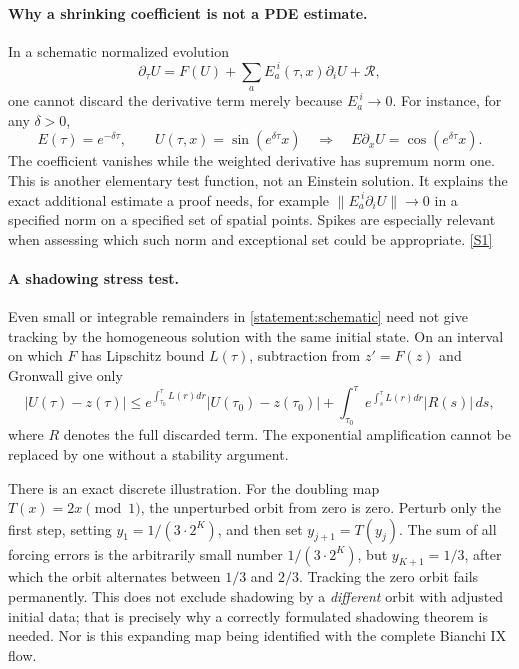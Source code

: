 \documentclass[11pt,a4paper]{article}
\newcommand{\sref}[2]{\hyperlink{source:#1:#2}{[S#2]}}
\numberwithin{equation}{section}
\begin{document}
\paragraph{Why a shrinking coefficient is not a PDE estimate.}
In a schematic normalized evolution
\begin{equation}\label{statement:schematic}
 \partial_\tau U=F(U)+\sum_a E_a^{\ i}(\tau,x)\partial_iU+\mathcal R,
\end{equation}
one cannot discard the derivative term merely because $E_a^{\ i}\to0$.
For instance, for any $\delta>0$,
\[
 E(\tau)=e^{-\delta\tau},\qquad
 U(\tau,x)=\sin(e^{\delta\tau}x)
 \quad\Longrightarrow\quad
 E\partial_xU=\cos(e^{\delta\tau}x).
\]
The coefficient vanishes while the weighted derivative has supremum norm one.
This is another elementary test function, not an Einstein solution. It
explains the exact additional estimate a proof needs, for example
$\|E_a^{\ i}\partial_iU\|\to0$ in a specified norm on a specified set of spatial
points. Spikes are especially relevant when assessing which such norm and
exceptional set could be appropriate. \sref{statement}{1}

\paragraph{A shadowing stress test.}
Even small or integrable remainders in \eqref{statement:schematic} need not give
tracking by the homogeneous solution with the same initial state. On an
interval on which $F$ has Lipschitz bound $L(\tau)$, subtraction from
$z'=F(z)$ and Gronwall give only
\begin{equation}\label{statement:gronwall}
 |U(\tau)-z(\tau)|\le
 e^{\int_{\tau_0}^\tau L(r)dr}|U(\tau_0)-z(\tau_0)|
 +\int_{\tau_0}^\tau e^{\int_s^\tau L(r)dr}|R(s)|\,ds,
\end{equation}
where $R$ denotes the full discarded term. The exponential amplification
cannot be replaced by one without a stability argument.

There is an exact discrete illustration. For the doubling map
$T(x)=2x\pmod1$, the unperturbed orbit from zero is zero. Perturb only the
first step, setting $y_1=1/(3\cdot2^K)$, and then set $y_{j+1}=T(y_j)$.
The sum of all forcing errors is the arbitrarily small number
$1/(3\cdot2^K)$, but $y_{K+1}=1/3$, after which the orbit alternates between
$1/3$ and $2/3$. Tracking the zero orbit fails permanently. This does not
exclude shadowing by a \emph{different} orbit with adjusted initial data;
that is precisely why a correctly formulated shadowing theorem is needed.
Nor is this expanding map being identified with the complete Bianchi IX
flow.
\end{document}
